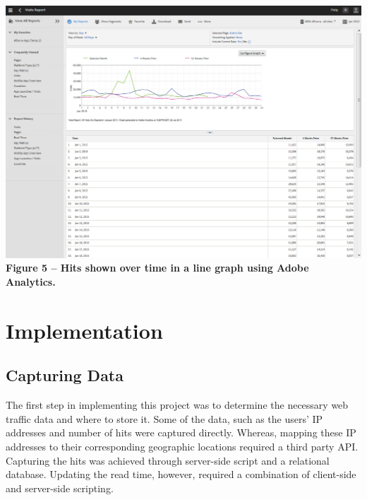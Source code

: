 \documentclass[12pt]{article}
\begin{document}
\noindent\includegraphics[scale=0.4]{img/adobe} \\
\noindent\textbf{Figure 5 -- Hits shown over time in a line graph using Adobe Analytics.} \\

\vfill


\section{Implementation}
\subsection{Capturing Data}
The first step in implementing this project was to determine the necessary web traffic data and where to store it. Some of the data, such as the users' IP addresses and number of hits were captured directly. Whereas, mapping these IP addresses to their corresponding geographic locations required a third party API. Capturing the hits was achieved through server-side script and a relational database. Updating the read time, however, required a combination of client-side and server-side scripting.   
\end{document}
